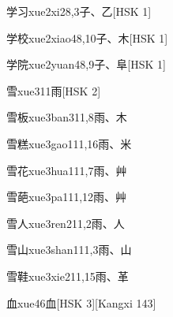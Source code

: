\begin{entry}{学习}{xue2xi2}{8,3}{⼦、⼄}[HSK 1]
\end{entry}

\begin{entry}{学校}{xue2xiao4}{8,10}{⼦、⽊}[HSK 1]
\end{entry}

\begin{entry}{学院}{xue2yuan4}{8,9}{⼦、⾩}[HSK 1]
\end{entry}

\begin{entry}{雪}{xue3}{11}{⾬}[HSK 2]
\end{entry}

\begin{entry}{雪板}{xue3ban3}{11,8}{⾬、⽊}
\end{entry}

\begin{entry}{雪糕}{xue3gao1}{11,16}{⾬、⽶}
\end{entry}

\begin{entry}{雪花}{xue3hua1}{11,7}{⾬、⾋}
\end{entry}

\begin{entry}{雪葩}{xue3pa1}{11,12}{⾬、⾋}
\end{entry}

\begin{entry}{雪人}{xue3ren2}{11,2}{⾬、⼈}
\end{entry}

\begin{entry}{雪山}{xue3shan1}{11,3}{⾬、⼭}
\end{entry}

\begin{entry}{雪鞋}{xue3xie2}{11,15}{⾬、⾰}
\end{entry}

\begin{entry}{血}{xue4}{6}{⾎}[HSK 3][Kangxi 143]
\end{entry}

